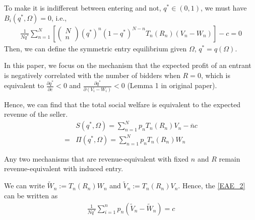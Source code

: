 \documentclass[11pt]{elegantbook_2}
\begin{document}
To make it is indifferent between entering and not, $q^*\in (0,1)$, we must have $B_i(q^*,\Omega)=0$, i.e.,
\begin{equation}
    \begin{aligned}
        \frac{1}{Nq^*}\sum_{n=1}^N\left[
            \begin{pmatrix}
            N\\
            n
        \end{pmatrix}
        (q^*)^{n}(1-q^*)^{N-n}T_n(R_n)\left(V_n-W_n\right)
        \right]-c=0
    \end{aligned}
    \label{EAE_2}
\end{equation}
Then, we can define the symmetric entry equilibrium given $\Omega$, $q^*=q(\Omega)$.
\begin{assumption}
    In this paper, we focus on the mechanism that the expected profit of an entrant is negatively correlated with the number of bidders when $R=0$, which is equivalent to $\frac{\partial q^*}{\partial c}<0$ and $\frac{\partial q^*}{\partial (V_i-W_i)}<0$ (Lemma 1 in original paper).
\end{assumption}

Hence, we can find that the total social welfare is equivalent to the expected revenue of the seller.
\begin{equation}
    \begin{aligned}
        &S(q^*,\Omega)=\sum_{n=1}^N p_n T_n(R_n)V_n-\bar{n}c\\
        =&\Pi(q^*,\Omega)=\sum_{n=1}^N p_n T_n(R_n)W_n
    \end{aligned}
    \nonumber
\end{equation}

\begin{proposition}
    Any two mechanisms that are revenue-equivalent with fixed $n$ and $R$ remain revenue-equivalent with induced entry.
\end{proposition}

We can write $\tilde{W}_n:=T_n(R_n)W_n$ and $\tilde{V}_n:=T_n(R_n)V_n$. Hence, the \eqref{EAE_2} can be written as
\begin{equation}
    \begin{aligned}
        \frac{1}{Nq^*}\sum_{i=1}^n p_n \left(\tilde{V}_n-\tilde{W}_n\right)=c
    \end{aligned}
    \label{EAE_3}
\end{equation}
\end{document}
